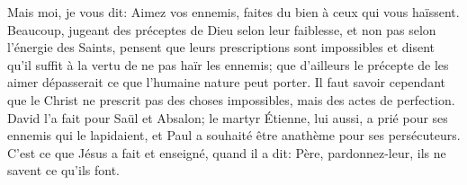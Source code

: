 Mais moi, je vous dit:
	Aimez vos ennemis, faites du bien à ceux qui vous haïssent.
Beaucoup, jugeant des préceptes de Dieu selon leur faiblesse,
	et non pas selon l’énergie des Saints,
	pensent que leurs prescriptions sont impossibles
	et disent qu’il suffit à la vertu de ne pas haïr les ennemis;
	que d’ailleurs le précepte de les aimer dépasserait
	ce que l’humaine nature peut porter.
Il faut savoir cependant que le Christ ne prescrit pas des choses impossibles,
	mais des actes de perfection.
David l’a fait pour Saül et Absalon;
	le martyr Étienne, lui aussi, a prié pour ses ennemis qui le lapidaient,
	et Paul a souhaité être anathème pour ses persécuteurs.
C’est ce que Jésus a fait et enseigné, quand il a dit:
	Père, pardonnez-leur, ils ne savent ce qu’ils font.
